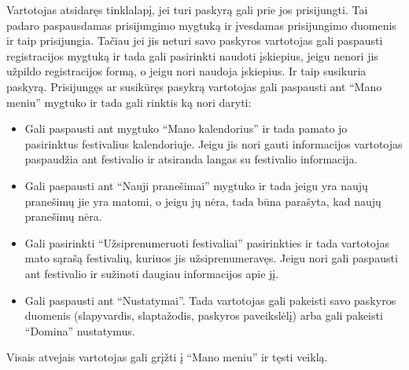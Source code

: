 ﻿\documentclass{VUMIFPSkursinis}
\begin{document}
Vartotojas atsidaręs tinklalapį, jei turi paskyrą gali prie jos prisijungti. Tai padaro paspausdamas prisijungimo mygtuką ir įvesdamas prisijungimo duomenis ir taip prisijungia. Tačiau jei jis neturi savo paskyros vartotojas gali paspausti registracijos mygtuką ir tada gali pasirinkti naudoti įskiepius, jeigu nenori jis užpildo registracijos formą, o jeigu nori naudoja įskiepius. Ir taip susikuria paskyrą.
	Prisijungęs ar susikūręs pasykrą vartotojas gali paspausti ant “Mano meniu” mygtuko ir tada gali rinktis ką nori daryti:
\begin{itemize}
\item Gali paspausti ant mygtuko “Mano kalendorius” ir tada pamato jo pasirinktus festivalius kalendoriuje. Jeigu jis nori gauti informacijos vartotojas paspaudžia ant festivalio ir atsiranda langas su festivalio informacija.
\item Gali paspausti ant “Nauji pranešimai” mygtuko ir tada jeigu yra naujų pranešimų jie yra matomi, o jeigu jų nėra, tada būna parašyta, kad naujų pranešimų nėra. 
\item Gali pasirinkti “Užsiprenumeruoti festivaliai” pasirinkties ir tada vartotojas mato sąrašą festivalių, kuriuos jis užsiprenumeravęs. Jeigu nori gali paspausti ant festivalio ir sužinoti daugiau informacijos apie jį.
\item Gali paspausti ant “Nustatymai”. Tada vartotojas gali pakeisti savo paskyros duomenis (slapyvardis, slaptažodis, paskyros paveikslėlį) arba gali pakeisti “Domina” nustatymus.
\end{itemize}
 Visais atvejais vartotojas gali grįžti į “Mano meniu” ir tęsti veiklą.
 
\end{document}

